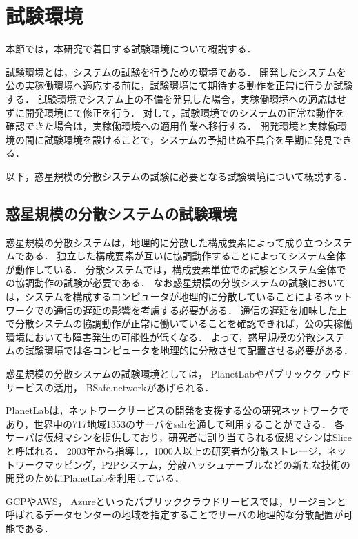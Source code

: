 \section{試験環境}
\label{bg:staging}

本節では，本研究で着目する試験環境について概説する．

試験環境とは，システムの試験を行うための環境である．
開発したシステムを公の実稼働環境へ適応する前に，試験環境にて期待する動作を正常に行うか試験する．
試験環境でシステム上の不備を発見した場合，実稼働環境への適応はせずに開発環境にて修正を行う．
対して，試験環境でのシステムの正常な動作を確認できた場合は，実稼働環境への適用作業へ移行する．
開発環境と実稼働環境の間に試験環境を設けることで，システムの予期せぬ不具合を早期に発見できる．

以下，惑星規模の分散システムの試験に必要となる試験環境について概説する．

\subsection{惑星規模の分散システムの試験環境}
\label{bg:staging:planetary-scale-distributed-system}

惑星規模の分散システムは，地理的に分散した構成要素によって成り立つシステムである．
独立した構成要素が互いに協調動作することによってシステム全体が動作している．
分散システムでは，構成要素単位での試験とシステム全体での協調動作の試験が必要である．
なお惑星規模の分散システムの試験においては，システムを構成するコンピュータが地理的に分散していることによるネットワークでの通信の遅延の影響を考慮する必要がある．
通信の遅延を加味した上で分散システムの協調動作が正常に働いていることを確認できれば，公の実稼働環境においても障害発生の可能性が低くなる．
よって，惑星規模の分散システムの試験環境では各コンピュータを地理的に分散させて配置させる必要がある．

惑星規模の分散システムの試験環境としては， PlanetLabやパブリッククラウドサービスの活用， BSafe.networkがあげられる．

PlanetLabは，ネットワークサービスの開発を支援する公の研究ネットワークであり，世界中の717地域1353のサーバをsshを通して利用することができる．
各サーバは仮想マシンを提供しており，研究者に割り当てられる仮想マシンはSliceと呼ばれる．
2003年から指導し，1000人以上の研究者が分散ストレージ，ネットワークマッピング，P2Pシステム，分散ハッシュテーブルなどの新たな技術の開発のためにPlanetLabを利用している．

GCPやAWS， Azureといったパブリッククラウドサービスでは，リージョンと呼ばれるデータセンターの地域を指定することでサーバの地理的な分散配置が可能である．

